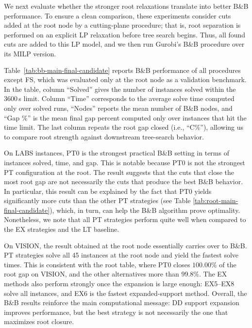 We next evaluate whether the stronger root relaxations translate into better B\&B performance. To ensure a clean comparison, these experiments consider cuts added at the root node by a cutting-plane procedure; that is, root separation is performed on an explicit LP relaxation before tree search begins. Thus, all found cuts are added to this LP model, and we then run Gurobi's B\&B procedure over its MILP version. %





Table~\ref{tab:bb-main-final-candidate} reports B\&B performance of all procedures except FS, which was evaluated only at the root node as a validation benchmark. In the table, column ``Solved'' gives the number of instances solved within the 3600\,s limit. Column ``Time'' corresponds to the average solve time computed only over solved runs, ``Nodes'' reports the mean number of B\&B nodes, and ``Gap \%'' is the mean final gap percent computed only over instances that hit the time limit. The last column repeats the root gap closed (i.e.,  ``C\%''), allowing us to compare root strength against downstream tree-search behavior.

On LABS instances, PT0 is the strongest practical B\&B setting in terms of instances solved, time, and gap. This is notable because PT0 is not the strongest PT configuration at the root. The result suggests that the cuts that close the most root gap are not necessarily the cuts that produce the best B\&B behavior. In particular, this result can be explained by the fact that PT0 yields significantly more cuts than the other PT strategies (see Table \ref{tab:root-main-final-candidate}), which, in turn, can help the B\&B algorithm prove optimality. Nonetheless, we note that all PT strategies perform quite well when compared to the EX strategies and the LT baseline.

On VISION, the result obtained at the root node essentially carries over to B\&B. PT strategies solve all 45 instances at the root node and yield the fastest solve times. This is consistent with the root table, where PT0 closes $100.00\%$ of the root gap on VISION, and the other alternatives more than $99.8\%$. The EX methods also perform strongly once the expansion is large enough: EX5--EX8 solve all instances, and EX6 is the fastest expanded-support method. Overall, the B\&B results reinforce the main computational message: DD support expansion improves performance, but the best strategy is not necessarily the one that maximizes root closure.

